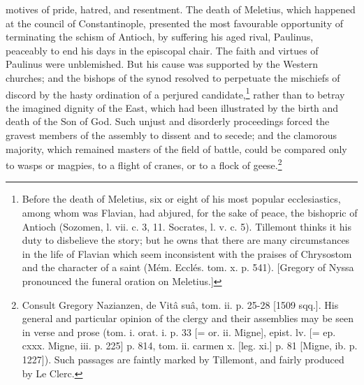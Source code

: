 motives of pride, hatred, and resentment. The death of Meletius, which happened at the council of Constantinople, presented the most favourable opportunity of terminating the schism of Antioch, by suffering his aged rival, Paulinus, peaceably to end his days in the episcopal chair. The faith and virtues of Paulinus were unblemished. But his cause was supported by the Western churches; and the bishops of the synod resolved to perpetuate the mischiefs of discord by the hasty ordination of a perjured candidate,\footnote{Before the death of Meletius, six or eight of his most popular ecclesiastics, among whom was Flavian, had abjured, for the sake of peace, the bishopric of Antioch (Sozomen, l. vii. c. 3, 11. Socrates, l. v. c. 5). Tillemont thinks it his duty to disbelieve the story; but he owns that there are many circumstances in the life of Flavian which seem inconsistent with the praises of Chrysostom and the character of a saint (Mém. Ecclés. tom. x. p. 541). [Gregory of Nyssa pronounced the funeral oration on Meletius.]} rather than to betray the imagined dignity of the East, which had been illustrated by the birth and death of the Son of God. Such unjust and disorderly proceedings forced the gravest members of the assembly to dissent and to secede; and the clamorous majority, which remained masters of the field of battle, could be compared only to wasps or magpies, to a flight of cranes, or to a flock of geese.\footnote{Consult Gregory Nazianzen, de Vitâ suâ, tom. ii. p. 25-28 [1509 sqq.]. His general and particular opinion of the clergy and their assemblies may be seen in verse and prose (tom. i. orat. i. p. 33 [= or. ii. Migne], epist. lv. [= ep. cxxx. Migne, iii. p. 225] p. 814, tom. ii. carmen x. [leg. xi.] p. 81 [Migne, ib. p. 1227]). Such passages are faintly marked by Tillemont, and fairly produced by Le Clerc.}

